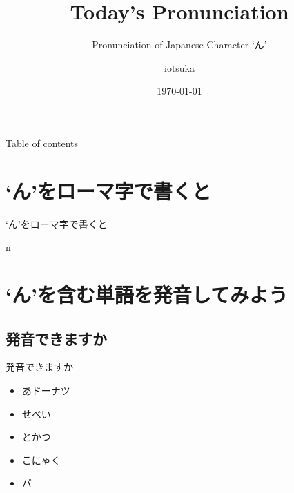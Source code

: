 \documentclass[aspectratio=169,xcolor={dvipsnames,table}]{beamer}
\title{Today's Pronunciation}
\subtitle{Pronunciation of Japanese Character `ん'}
\date[]{\today}
\author{iotsuka}
\institute{Eduop ちば}
\begin{document}
\maketitle

   \begin{frame}[toc]{Table of contents}%
      \tableofcontents%
   \end{frame}

\section{`ん'をローマ字で書くと}
\begin{frame}[plain]{`ん'をローマ字で書くと}

\Huge n

\end{frame}
\section{`ん'を含む単語を発音してみよう}
\subsection{発音できますか}
\begin{frame}[plain]{発音できますか}
 \begin{itemize}
  \item あドーナツ
  \item せべい
  \item とかつ
  \item こにゃく
  \item パ
 \end{itemize}
\end{frame}
\end{document}
